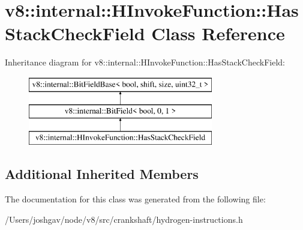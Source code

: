 \hypertarget{classv8_1_1internal_1_1_h_invoke_function_1_1_has_stack_check_field}{}\section{v8\+:\+:internal\+:\+:H\+Invoke\+Function\+:\+:Has\+Stack\+Check\+Field Class Reference}
\label{classv8_1_1internal_1_1_h_invoke_function_1_1_has_stack_check_field}
Inheritance diagram for v8\+:\+:internal\+:\+:H\+Invoke\+Function\+:\+:Has\+Stack\+Check\+Field\+:\begin{figure}[H]
\begin{center}
\leavevmode
\includegraphics[height=3.000000cm]{classv8_1_1internal_1_1_h_invoke_function_1_1_has_stack_check_field}
\end{center}
\end{figure}
\subsection*{Additional Inherited Members}


The documentation for this class was generated from the following file\+:\begin{DoxyCompactItemize}
\item 
/\+Users/joshgav/node/v8/src/crankshaft/hydrogen-\/instructions.\+h\end{DoxyCompactItemize}
